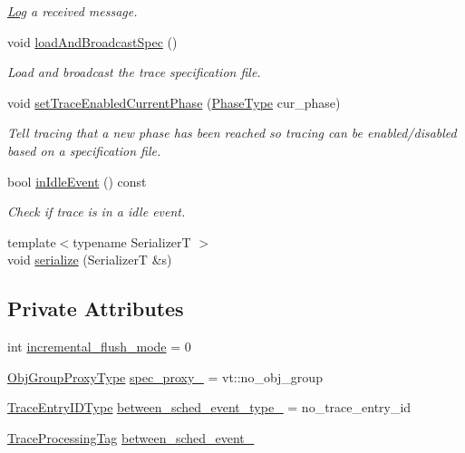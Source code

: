 \begin{DoxyCompactItemize}
\begin{DoxyCompactList}\small\item\em \hyperlink{structvt_1_1trace_1_1_log}{Log} a received message. \end{DoxyCompactList}\item 
void \hyperlink{structvt_1_1trace_1_1_trace_a06f74f8d2c0c2fb97be14a264fd36a45}{load\+And\+Broadcast\+Spec} ()
\begin{DoxyCompactList}\small\item\em Load and broadcast the trace specification file. \end{DoxyCompactList}\item 
void \hyperlink{structvt_1_1trace_1_1_trace_aa2740411eec8e1dabf10d60f48193e69}{set\+Trace\+Enabled\+Current\+Phase} (\hyperlink{namespacevt_a46ce6733d5cdbd735d561b7b4029f6d7}{Phase\+Type} cur\+\_\+phase)
\begin{DoxyCompactList}\small\item\em Tell tracing that a new phase has been reached so tracing can be enabled/disabled based on a specification file. \end{DoxyCompactList}\item 
bool \hyperlink{structvt_1_1trace_1_1_trace_a1e7429d95dbddd9f235a02800d158d36}{in\+Idle\+Event} () const
\begin{DoxyCompactList}\small\item\em Check if trace is in a idle event. \end{DoxyCompactList}\item 
{\footnotesize template$<$typename SerializerT $>$ }\\void \hyperlink{structvt_1_1trace_1_1_trace_a737d62cb21f0b634ca5a45e0221f7ee9}{serialize} (SerializerT \&s)
\end{DoxyCompactItemize}
\subsection*{Private Attributes}
\begin{DoxyCompactItemize}
\item 
int \hyperlink{structvt_1_1trace_1_1_trace_a0f00be1050ef823347cf2d5daaa0e1c4}{incremental\+\_\+flush\+\_\+mode} = 0
\item 
\hyperlink{namespacevt_ad7cae989df485fccca57f0792a880a8e}{Obj\+Group\+Proxy\+Type} \hyperlink{structvt_1_1trace_1_1_trace_a15282e64860d2a553d39396c9c1fe784}{spec\+\_\+proxy\+\_\+} = vt\+::no\+\_\+obj\+\_\+group
\item 
\hyperlink{namespacevt_1_1trace_a3c14050715ba9eceaeff51fb3de64f2f}{Trace\+Entry\+I\+D\+Type} \hyperlink{structvt_1_1trace_1_1_trace_a3be76c8f807837a4b242a5a28c005599}{between\+\_\+sched\+\_\+event\+\_\+type\+\_\+} = no\+\_\+trace\+\_\+entry\+\_\+id
\item 
\hyperlink{structvt_1_1trace_1_1_trace_processing_tag}{Trace\+Processing\+Tag} \hyperlink{structvt_1_1trace_1_1_trace_a3fdadda342771b037bb85aa77e0fc9cb}{between\+\_\+sched\+\_\+event\+\_\+}
\end{DoxyCompactItemize}
